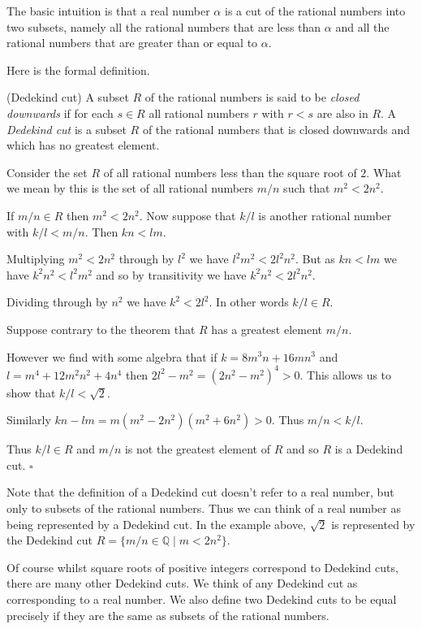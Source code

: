 \documentclass[10pt]{article}
\newcommand{\Q}{\mathbb{Q}}
\newcommand{\qed}{\square}
\newenvironment{definition}[1][Definition]{\begin{trivlist}
\item[\hskip \labelsep {\bfseries #1}]}{\end{trivlist}}
\newenvironment{example}[1][Example]{\begin{trivlist}
\item[\hskip \labelsep {\bfseries #1}]}{\end{trivlist}}
\begin{document}
The basic intuition is that a real number $\alpha$ is a cut of the rational numbers into two subsets, namely all the rational numbers that are less than $\alpha$ and all the rational numbers that are greater than or equal to $\alpha$.

Here is the formal definition.

\begin{definition} (Dedekind cut)
A subset $R$ of the rational numbers is said to be \emph{closed downwards} if for each $s \in R$ all rational numbers $r$ with $r < s$ are also in $R$. A \emph{Dedekind cut} is a subset $R$ of the rational numbers that is closed downwards and which has no greatest element.
\end{definition}

\begin{example}
Consider the set $R$ of all rational numbers less than the square root of $2$. What we mean by this is the set of all rational numbers $m/n$ such that $m^2 < 2n^2$.

If $m/n \in R$ then $m^2 < 2n^2$. Now suppose that $k/l$ is another rational number with $k/l < m/n$. Then $kn < lm$.

Multiplying $m^2 < 2n^2$ through by $l^2$ we have $l^2m^2 < 2l^2n^2$. But as $kn < lm$ we have $k^2n^2 < l^2m^2$ and so by transitivity we have $k^2n^2 < 2l^2n^2$.

Dividing through by $n^2$ we have $k^2 < 2l^2$. In other words $k/l \in R$.

Suppose contrary to the theorem that $R$ has a greatest element $m/n$. 

However we find with some algebra that if $k = 8m^3n + 16mn^3$ and $l = m^4 + 12m^2n^2 + 4n^4$ then $2l^2 - m^2 = (2n^2 - m^2)^4 > 0$. This allows us to show that $k/l < \sqrt{2}$.

Similarly $kn - lm = m(m^2 - 2n^2)(m^2 + 6n^2) > 0$. Thus $m/n < k/l$.

Thus $k/l \in R$ and $m/n$ is not the greatest element of $R$ and so $R$ is a Dedekind cut. $\qed$
\end{example}

Note that the definition of a Dedekind cut doesn't refer to a real number, but only to subsets of the rational numbers. Thus we can think of a real number as being represented by a Dedekind cut. In the example above, $\sqrt{2}$ is represented by the Dedekind cut $R = \{m/n \in \Q \;|\; m < 2n^2\}$.

Of course whilst square roots of positive integers correspond to Dedekind cuts, there are many other Dedekind cuts. We think of any Dedekind cut as corresponding to a real number. We also define two Dedekind cuts to be equal precisely if they are the same as subsets of the rational numbers.
\end{document}
